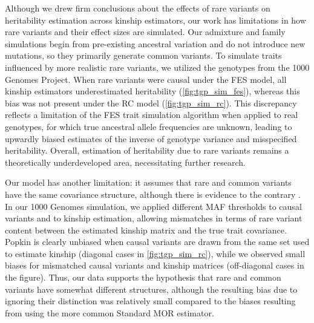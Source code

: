 \documentclass[11pt]{article}
\begin{document}
Although we drew firm conclusions about the effects of rare variants on heritability estimation across kinship estimators, our work has limitations in how rare variants and their effect sizes are simulated.
Our admixture and family simulations begin from pre-existing ancestral variation and do not introduce new mutations, so they primarily generate common variants. 
To simulate traits influenced by more realistic rare variants, we utilized the genotypes from the 1000 Genomes Project. 
When rare variants were causal under the FES model, all kinship estimators underestimated heritability (\cref{fig:tgp_sim_fes}), whereas this bias was not present under the RC model (\cref{fig:tgp_sim_rc}). 
This discrepancy reflects a limitation of the FES trait simulation algorithm when applied to real genotypes, for which true ancestral allele frequencies are unknown, leading to upwardly biased estimates of the inverse of genotype variance and misspecified heritability.
Overall, estimation of heritability due to rare variants remains a theoretically underdeveloped area, necessitating further research. 

Our model has another limitation: it assumes that rare and common variants have the same covariance structure, although there is evidence to the contrary \citep{zaidi_demographic_2020}.
In our 1000 Genomes simulation, we applied different MAF thresholds to causal variants and to kinship estimation, allowing mismatches in terms of rare variant content between the estimated kinship matrix and the true trait covariance.
Popkin is clearly unbiased when causal variants are drawn from the same set used to estimate kinship (diagonal cases in \cref{fig:tgp_sim_rc}), while we observed small biases for mismatched causal variants and kinship matrices (off-diagonal cases in the figure).
Thus, our data supports the hypothesis that rare and common variants have somewhat different structures, although the resulting bias due to ignoring their distinction was relatively small compared to the biases resulting from using the more common Standard MOR estimator.
\end{document}
